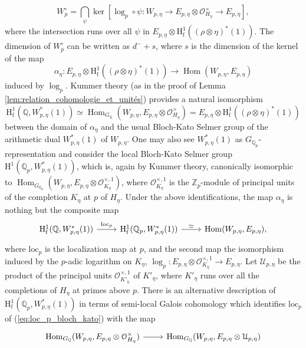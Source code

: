 \documentclass[12pt]{amsart}
\newcommand\bQ{\mathbb{Q}}
\newcommand\Zp{{\mathbb{Z}_p}}
\newcommand\Qp{{\mathbb{Q}_p}}
\newcommand\cO{\mathcal{O}}
\newcommand\cU{\mathcal{U}}
\newcommand{\loc}{\mathrm{loc}}
\DeclareMathOperator{\Hom}{Hom}
\newcommand{\HH}{\mathrm{H}}
\newcommand{\ff}{\mathrm{f}}
\theoremstyle{defstyle}
\theoremstyle{thmstyle}
\begin{document}
\[W_p^{\circ}=\bigcap_{\psi}\ker\left[\log_p \circ \psi : W_{p,\eta} \longrightarrow E_{p,\eta}\otimes \cO_{H_\eta}^\times \longrightarrow E_{p,\eta}\right], 
\]
where the intersection runs over all  $\psi$ in $ E_{p,\eta}\otimes\HH^1_\ff((\rho\otimes\eta)^*(1))$. The dimension of $W_p^{\circ}$ can be written as $d^-+s$, where $s$ is the dimension of the kernel of the map \[\alpha_\eta:E_{p,\eta}\otimes\HH^1_\ff((\rho\otimes\eta)^*(1)) \longrightarrow \Hom(W_{p,\eta},E_{p,\eta})\]
induced by $\log_p$.
Kummer theory (as in the proof of Lemma \ref{lem:relation_cohomologie_et_unités}) provides a natural isomorphism
\begin{equation}\label{eq:bloch-kato-kummer}
	\HH^1_\ff(\bQ,W_{p,\eta}^*(1)) \simeq \Hom_{G_{\bQ}}(W_{p,\eta},E_{p,\eta} \otimes \cO_{H_\eta}^\times)=E_{p,\eta}\otimes\HH^1_\ff((\rho\otimes\eta)^*(1)) 
\end{equation}
between the domain of $\alpha_\eta$ and the usual Bloch-Kato Selmer group of the arithmetic dual $W_{p,\eta}^*(1)$ of $W_{p,\eta}$. One may also see $W_{p,\eta}^*(1)$ as $G_{\Qp}$-representation and consider the local Bloch-Kato Selmer group $\HH^1(\Qp,W_{p,\eta}^*(1))$, which is, again by Kummer theory, canonically isomorphic to $\Hom_{G_{\Qp}}(W_{p,\eta},E_{p,\eta}\otimes \cO^{\times,1}_{K_\eta})$, where $\cO^{\times,1}_{K_\eta}$ is the $\Zp$-module of principal units of the completion $K_\eta$ at $p$ of $H_\eta$. Under the above identifications, the map $\alpha_\eta$ is nothing but the composite map 
\begin{equation}\label{eq:loc_p_bloch_kato}
\begin{tikzcd} \HH^1_\ff(\bQ,W_{p,\eta}^*(1)) \ar[r, "\loc_p"] & \HH^1_\ff(\bQ_p,W_{p,\eta}^*(1)) \ar[r, "\simeq"] & \Hom(W_{p,\eta},E_{p,\eta}),
\end{tikzcd}
\end{equation}
where $\loc_p$ is the localization map at $p$, and the second map the isomorphism induced by the $p$-adic logarithm on $K_\eta$, $\log_p : E_{p,\eta} \otimes \cO^{\times,1}_{K_\eta} \longrightarrow E_{p,\eta}$. Let $\cU_{p,\eta}$ be the product of the principal units $\cO^{\times,1}_{K'_\eta}$ of $K'_\eta$, where $K'_\eta$ runs over all the completions of $H_\eta$ at primes above $p$. There is an alternative description of $\HH^1_\ff(\bQ_p,W_{p,\eta}^*(1))$ in terms of semi-local Galois cohomology which identifies $\loc_p$ of (\ref{eq:loc_p_bloch_kato}) with the map 
\begin{equation}\label{eq:loc_p_et_leopoldt}
\begin{tikzcd}\Hom_{G_{\bQ}}(W_{p,\eta},E_{p,\eta}\otimes \cO^\times_{H_\eta}) \rar &\Hom_{G_{\bQ}}(W_{p,\eta},E_{p,\eta}\otimes \cU_{p,\eta})
\end{tikzcd}
\end{equation}
\end{document}
